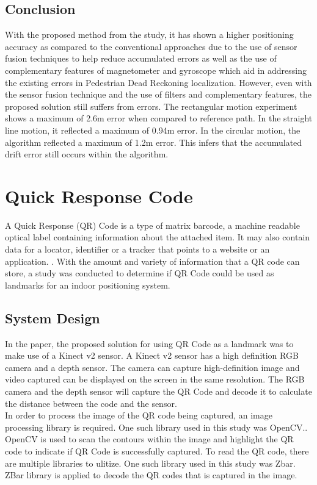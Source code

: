 \documentclass{l4proj}
\begin{document}
\subsection{Conclusion}
With the proposed method from the study, it has shown a higher positioning accuracy as compared to the conventional approaches due to the use of sensor fusion techniques to help reduce accumulated errors as well as the use of complementary features of magnetometer and gyroscope which aid in addressing the existing errors in Pedestrian Dead Reckoning localization. However, even with the sensor fusion technique and the use of filters and complementary features, the proposed solution still suffers from errors. The rectangular motion experiment shows a maximum of 2.6m error when compared to reference path. In the straight line motion, it reflected a maximum of 0.94m error. In the circular motion, the algorithm reflected a maximum of 1.2m error. This infers that the accumulated drift error still occurs within the algorithm.

\section{Quick Response Code}
A Quick Response (QR) Code is a type of matrix barcode, a machine readable optical label containing information about the attached item. It may also contain data for a locator, identifier or a tracker that points to a website or an application. \cite{qrwiki}. With the amount and variety of information that a QR code can store, a study was conducted to determine if QR Code could be used as landmarks for an indoor positioning system.

\subsection{System Design}
In the paper, the proposed solution for using QR Code as a landmark was to make use of a Kinect v2 sensor.\cite{qrcodelm} A Kinect v2 sensor has a high definition RGB camera and a depth sensor. The camera can capture high-definition image and video captured can be displayed on the screen in the same resolution. The RGB camera and the depth sensor will capture the QR Code and decode it to calculate the distance between the code and the sensor.\\
In order to process the image of the QR code being captured, an image processing library is required. One such library used in this study was OpenCV.\cite{openvc}. OpenCV is used to scan the contours within the image and highlight the QR code to indicate if QR Code is successfully captured.\cite{opencvusage} To read the QR code, there are multiple libraries to ulitize. One such library used in this study was Zbar.\cite{zbar} ZBar library is applied to decode the QR codes that is captured in the image.
\end{document}
